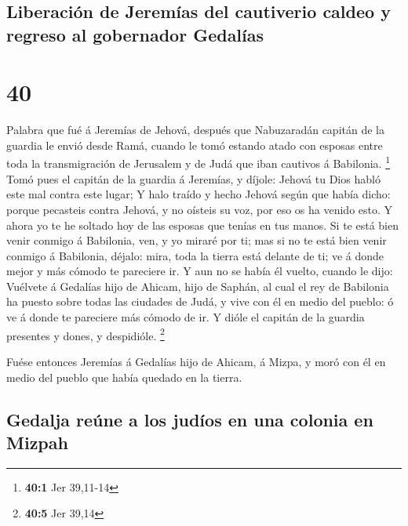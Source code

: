 \hypertarget{liberaciuxf3n-de-jeremuxedas-del-cautiverio-caldeo-y-regreso-al-gobernador-gedaluxedas}{%
\subsection{Liberación de Jeremías del cautiverio caldeo y regreso al
gobernador
Gedalías}\label{liberaciuxf3n-de-jeremuxedas-del-cautiverio-caldeo-y-regreso-al-gobernador-gedaluxedas}}

\hypertarget{section-39}{%
\section{40}\label{section-39}}

 Palabra que fué á Jeremías de Jehová, después que
Nabuzaradán capitán de la guardia le envió desde Ramá, cuando le tomó
estando atado con esposas entre toda la transmigración de Jerusalem y de
Judá que iban cautivos á Babilonia. \footnote{\textbf{40:1} Jer 39,11-14}
 Tomó pues el capitán de la guardia á Jeremías, y díjole:
Jehová tu Dios habló este mal contra este lugar;  Y halo
traído y hecho Jehová según que había dicho: porque pecasteis contra
Jehová, y no oísteis su voz, por eso os ha venido esto.  Y
ahora yo te he soltado hoy de las esposas que tenías en tus manos. Si te
está bien venir conmigo á Babilonia, ven, y yo miraré por ti; mas si no
te está bien venir conmigo á Babilonia, déjalo: mira, toda la tierra
está delante de ti; ve á donde mejor y más cómodo te pareciere ir.
 Y aun no se había él vuelto, cuando le dijo: Vuélvete á
Gedalías hijo de Ahicam, hijo de Saphán, al cual el rey de Babilonia ha
puesto sobre todas las ciudades de Judá, y vive con él en medio del
pueblo: ó ve á donde te pareciere más cómodo de ir. Y dióle el capitán
de la guardia presentes y dones, y despidióle. \footnote{\textbf{40:5}
  Jer 39,14}

 Fuése entonces Jeremías á Gedalías hijo de Ahicam, á
Mizpa, y moró con él en medio del pueblo que había quedado en la tierra.

\hypertarget{gedalja-reuxfane-a-los-juduxedos-en-una-colonia-en-mizpah}{%
\subsection{Gedalja reúne a los judíos en una colonia en
Mizpah}\label{gedalja-reuxfane-a-los-juduxedos-en-una-colonia-en-mizpah}}

